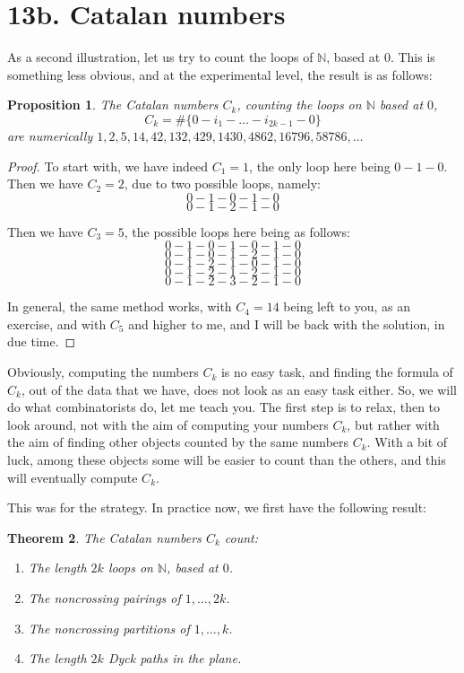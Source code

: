 \documentclass[12pt]{amsbook}
\newtheorem{theorem}{Theorem}[chapter]
\newtheorem{proposition}[theorem]{Proposition}
\begin{document}
\section*{13b. Catalan numbers}

As a second illustration, let us try to count the loops of $\mathbb N$, based at 0. This is something less obvious, and at the experimental level, the result is as follows:


\begin{proposition}
The Catalan numbers $C_k$, counting the loops on $\mathbb N$ based at $0$,
$$C_k=\#\Big\{0-i_1-\ldots-i_{2k-1}-0\Big\}$$
are numerically $1,2,5,14,42,132,429,1430,4862,16796,58786,\ldots$
\end{proposition}

\begin{proof}
To start with, we have indeed $C_1=1$, the only loop here being $0-1-0$. Then we have $C_2=2$, due to two possible loops, namely:
$$0-1-0-1-0$$
$$0-1-2-1-0$$

Then we have $C_3=5$, the possible loops here being as follows:
$$0-1-0-1-0-1-0$$
$$0-1-0-1-2-1-0$$
$$0-1-2-1-0-1-0$$
$$0-1-2-1-2-1-0$$
$$0-1-2-3-2-1-0$$

In general, the same method works, with $C_4=14$ being left to you, as an exercise, and with $C_5$ and higher to me, and I will be back with the solution, in due time.
\end{proof}

Obviously, computing the numbers $C_k$ is no easy task, and finding the formula of $C_k$, out of the data that we have, does not look as an easy task either. So, we will do what combinatorists do, let me teach you. The first step is to relax, then to look around, not with the aim of computing your numbers $C_k$, but rather with the aim of finding other objects counted by the same numbers $C_k$. With a bit of luck, among these objects some will be easier to count than the others, and this will eventually compute $C_k$.

\bigskip

This was for the strategy. In practice now, we first have the following result:


\begin{theorem}
The Catalan numbers $C_k$ count:
\begin{enumerate}
\item The length $2k$ loops on $\mathbb N$, based at $0$.

\item The noncrossing pairings of $1,\ldots,2k$.

\item The noncrossing partitions of $1,\ldots,k$.

\item The length $2k$ Dyck paths in the plane.
\end{enumerate}
\end{theorem}
\end{document}
